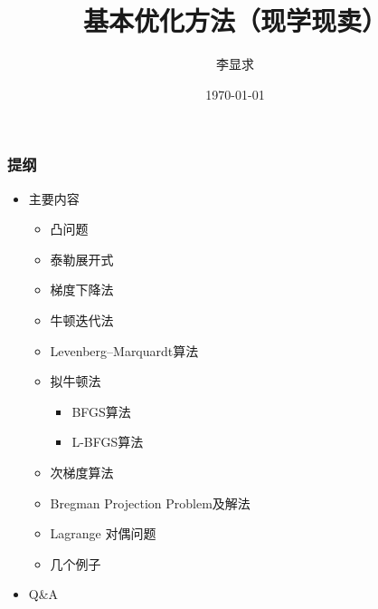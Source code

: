 \documentclass{beamer}
\begin{document}
    \title{基本优化方法（现学现卖）}
    \author{李显求}
    \date{\today}
    \frame{\titlepage}
\begin{frame}\frametitle{提纲}
\begin{itemize}
\item 主要内容
\begin{itemize}
\item 凸问题
\item 泰勒展开式%
\item 梯度下降法%
\item 牛顿迭代法%
\item Levenberg–Marquardt算法%
\item 拟牛顿法%
\begin{itemize}
\item BFGS算法%
\item L-BFGS算法%
\end{itemize}
\item 次梯度算法%
\item Bregman Projection Problem及解法%
\item Lagrange 对偶问题%
\item 几个例子%
\end{itemize}
\item Q\&A
\end{itemize}
\end{frame}
\end{document}

